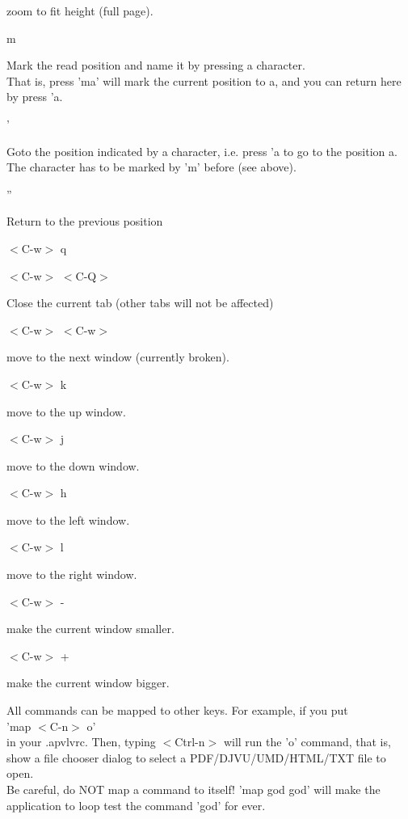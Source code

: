 \documentclass[a4paper,12pt]{article}
\begin{document}
\begin{description}
zoom to fit height (full page).

\item m

Mark the read position and name it by pressing a character. \\
That is, press 'ma' will mark the current position to a, and you can return here by press 'a.

\item '

Goto the position indicated by a character, i.e. press 'a to go to the position a. \\
The character has to be marked by 'm' before (see above).

\item ''

Return to the previous position

\item $<$C-w$>$ q
\item $<$C-w$>$ $<$C-Q$>$

Close the current tab (other tabs will not be affected)

\item $<$C-w$>$ $<$C-w$>$

move to the next window (currently broken).

\item $<$C-w$>$ k

move to the up window.

\item $<$C-w$>$ j

move to the down window.

\item $<$C-w$>$ h

move to the left window.

\item $<$C-w$>$ l

move to the right window.

\item $<$C-w$>$ -

make the current window smaller.

\item $<$C-w$>$ +

make the current window bigger.

\end{description}

\noindent All commands can be mapped to other keys. For example, if you put \\
'map $<$C-n$>$ o'\\
in your .apvlvrc. Then, typing $<$Ctrl-n$>$ will run the 'o' command, that is, show a file chooser dialog to select a PDF/DJVU/UMD/HTML/TXT file to open.\\
\noindent Be careful, do NOT map a command to itself! 'map god god' will make the application to loop test the command 'god' for ever.
\end{document}
